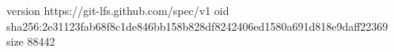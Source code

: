 version https://git-lfs.github.com/spec/v1
oid sha256:2e31123fab68f8c1de846bb158b828df8242406ed1580a691d818e9daff22369
size 88442
